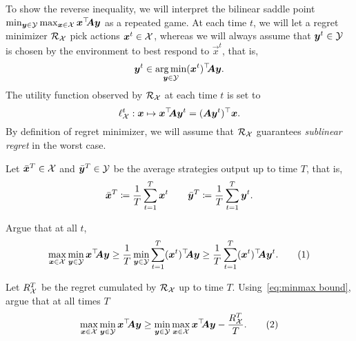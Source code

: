 \documentclass{homework}
\begin{document}
\noindent To show the reverse inequality, we will interpret the bilinear saddle point $\min_{\bm{y}\in\mathcal{Y}}\max_{\bm{x}\in\mathcal{X}} \bm{x}^\top\!\! \bm{A} \bm{y}$ as a repeated game. At each time $t$, we will let a regret minimizer $\mathcal{R}_{\mathcal{X}}$ pick actions $\bm{x}^t \in\mathcal{X}$, whereas we will always assume that $\bm{y}^t \in\mathcal{Y}$ is chosen by the environment to best respond to $\vec{x}^t$, that is,
\[
    \bm{y}^t \in \operatorname*{arg\,min}_{\bm{y} \in \mathcal{Y}} (\bm{x}^t)^\top\!\! \bm{A} \bm{y}.
\]
The utility function observed by $\mathcal{R}_{\mathcal{X}}$ at each time $t$ is set to
\begin{equation*}
    \ell^t_{\mathcal{X}} : \bm{x} \mapsto \bm{x}^\top\!\!\bm{A}\bm{y}^t = (\bm{A}\bm{y}^t)^\top \bm{x}.
\end{equation*}
By definition of regret minimizer, we will assume that $\mathcal{R}_{\mathcal{X}}$ guarantees \emph{sublinear regret} in the worst case.

Let $\bar{\bm{x}}^T \in \mathcal{X}$ and $\bar{\bm{y}}^T \in \mathcal{Y}$ be the average strategies output up to time $T$, that is,
\[
    \bar{\bm{x}}^T \coloneqq \frac{1}{T}\sum_{t=1}^T \bm{x}^t \qquad \bar{\bm{y}}^T \coloneqq \frac{1}{T}\sum_{t=1}^T \bm{y}^t.
\] 

\begin{problem}[5 points]
    Argue that at all $t$,
    \[
        \max_{\vec{x}\in\cX}\min_{\vec{y}\in\cY} \vec{x}^\top\!\! \vec{A} \vec{y} \ge \frac{1}{T} \min_{\vec{y}\in\cY}\sum_{t=1}^T (\vec{x}^t)^\top\!\!\vec{A}\vec{y} \ge \frac{1}{T}\sum_{t=1}^T (\vec{x}^t)^\top\!\!\vec{A}\vec{y}^t.
        \numberthis{eq:minmax bound}
    \]
\end{problem}
\begin{solution}
\end{solution}


\begin{problem}[5 points]
    Let $R_{\mathcal{X}}^T$ be the regret cumulated by $\mathcal{R}_{\mathcal{X}}$ up to time $T$. Using~\eqref{eq:minmax bound}, argue that at all times $T$
    \[
        \max_{\vec{x}\in\cX}\min_{\vec{y}\in\cY} \vec{x}^\top\!\! \vec{A} \vec{y} \ge \min_{\vec{y}\in\cY}\max_{\vec{x}\in\cX} \vec{x}^\top\!\! \vec{A} \vec{y} - \frac{R^T_\cX}{T}.
        \numberthis{eq:minmax bound 2}
    \]
\end{problem}
\begin{solution}
\end{solution}
\end{document}
